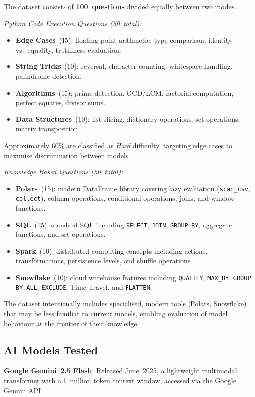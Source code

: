 \documentclass[12pt,a4paper]{article}
\begin{document}
The dataset consists of \textbf{100~questions} divided equally between two modes.

\textit{Python Code Execution Questions (50~total):}
\begin{itemize}[leftmargin=*]
  \item \textbf{Edge Cases}~(15): floating point arithmetic, type comparison, identity vs.\ equality, truthiness evaluation.
  \item \textbf{String Tricks}~(10): reversal, character counting, whitespace handling, palindrome detection.
  \item \textbf{Algorithms}~(15): prime detection, GCD/LCM, factorial computation, perfect squares, divisor sums.
  \item \textbf{Data Structures}~(10): list slicing, dictionary operations, set operations, matrix transposition.
\end{itemize}
Approximately 60\% are classified as \emph{Hard} difficulty, targeting edge cases to maximise discrimination between models.

\textit{Knowledge Based Questions (50~total):}
\begin{itemize}[leftmargin=*]
  \item \textbf{Polars}~(15): modern DataFrame library covering lazy evaluation (\texttt{scan\_csv}, \texttt{collect}), column operations, conditional operations, joins, and window functions.
  \item \textbf{SQL}~(15): standard SQL including \texttt{SELECT}, \texttt{JOIN}, \texttt{GROUP BY}, aggregate functions, and set operations.
  \item \textbf{Spark}~(10): distributed computing concepts including actions, transformations, persistence levels, and shuffle operations.
  \item \textbf{Snowflake}~(10): cloud warehouse features including \texttt{QUALIFY}, \texttt{MAX\_BY}, \texttt{GROUP BY ALL}, \texttt{EXCLUDE}, Time Travel, and \texttt{FLATTEN}.
\end{itemize}

The dataset intentionally includes specialised, modern tools (Polars, Snowflake) that may be less familiar to current models, enabling evaluation of model behaviour at the frontier of their knowledge.

\subsection{AI Models Tested}

\textbf{Google Gemini~2.5 Flash}: Released June~2025, a lightweight multimodal transformer with a 1~million token context window, accessed via the Google Gemini API.
\end{document}
